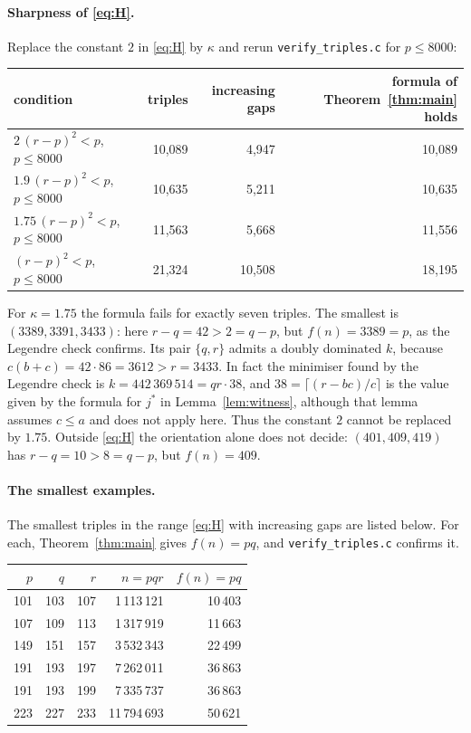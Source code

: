 \documentclass[11pt,a4paper]{article}
\theoremstyle{definition}
\begin{document}
\paragraph{Sharpness of \eqref{eq:H}.}
Replace the constant $2$ in \eqref{eq:H} by $\kappa$ and rerun \texttt{verify\_triples.c} for $p\le 8000$:
\begin{center}
\begin{tabular}{lrrr}\toprule
condition & triples & increasing gaps & formula of Theorem~\ref{thm:main} holds\\\midrule
$2\,(r-p)^2<p$, $p\le 8000$ & 10{,}089 & 4{,}947 & 10{,}089\\
$1.9\,(r-p)^2<p$, $p\le 8000$ & 10{,}635 & 5{,}211 & 10{,}635\\
$1.75\,(r-p)^2<p$, $p\le 8000$ & 11{,}563 & 5{,}668 & 11{,}556\\
$(r-p)^2<p$, $p\le 8000$ & 21{,}324 & 10{,}508 & 18{,}195\\
\bottomrule
\end{tabular}
\end{center}
For $\kappa=1.75$ the formula fails for exactly seven triples. The smallest is $(3389,3391,3433)$: here $r-q=42>2=q-p$, but $f(n)=3389=p$, as the Legendre check confirms. Its pair $\{q,r\}$ admits a doubly dominated $k$, because $c(b+c)=42\cdot86=3612>r=3433$. In fact the minimiser found by the Legendre check is $k=442\,369\,514=qr\cdot 38$, and $38=\lceil (r-bc)/c\rceil$ is the value given by the formula for $j^*$ in Lemma~\ref{lem:witness}, although that lemma assumes $c\le a$ and does not apply here. Thus the constant $2$ cannot be replaced by $1.75$. Outside \eqref{eq:H} the orientation alone does not decide: $(401,409,419)$ has $r-q=10>8=q-p$, but $f(n)=409$.

\paragraph{The smallest examples.}
The smallest triples in the range \eqref{eq:H} with increasing gaps are listed below. For each, Theorem~\ref{thm:main} gives $f(n)=pq$, and \texttt{verify\_triples.c} confirms it.
\begin{center}
\begin{tabular}{rrrrr}\toprule
$p$ & $q$ & $r$ & $n=pqr$ & $f(n)=pq$\\\midrule
101 & 103 & 107 & 1\,113\,121 & 10\,403\\
107 & 109 & 113 & 1\,317\,919 & 11\,663\\
149 & 151 & 157 & 3\,532\,343 & 22\,499\\
191 & 193 & 197 & 7\,262\,011 & 36\,863\\
191 & 193 & 199 & 7\,335\,737 & 36\,863\\
223 & 227 & 233 & 11\,794\,693 & 50\,621\\\bottomrule
\end{tabular}
\end{center}
\end{document}
